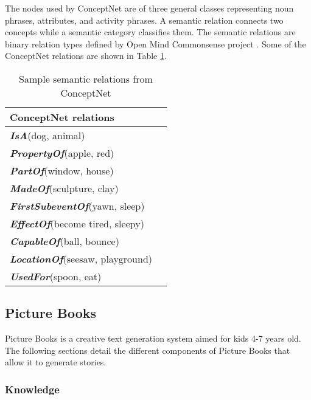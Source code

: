 The nodes used by ConceptNet are of three general classes representing noun phrases, attributes, and activity phrases. A semantic relation connects two concepts while a semantic category classifies them. The semantic relations are binary relation types defined by Open Mind Commonsense project \cite{Singh:2002}. Some of the ConceptNet relations are shown in Table \ref{tab:conceptnetrel}. 

\begin{table}[ht]   %
\centering
\caption{Sample semantic relations from ConceptNet \protect \cite{Liu:2004b}} \vspace{0.25em}
\begin{tabular}{|l|l|} \hline
ConceptNet relations \\ \hline
\textbf{\emph{IsA}}(dog, animal)  \\
\textbf{\emph{PropertyOf}}(apple, red) \\
\textbf{\emph{PartOf}}(window, house) \\ 
\textbf{\emph{MadeOf}}(sculpture, clay) \\
\textbf{\emph{FirstSubeventOf}}(yawn, sleep) \\
\textbf{\emph{EffectOf}}(become tired, sleepy) \\
\textbf{\emph{CapableOf}}(ball, bounce) \\
\textbf{\emph{LocationOf}}(seesaw, playground) \\
\textbf{\emph{UsedFor}}(spoon, eat) \\ \hline
\end{tabular}
\label{tab:conceptnetrel}
\end{table}

\subsection{Picture Books}
\label{sec:picturebooks}

Picture Books is a creative text generation system aimed for kids 4-7 years old. The following sections detail the different components of Picture Books that allow it to generate stories.

\subsubsection{Knowledge}

